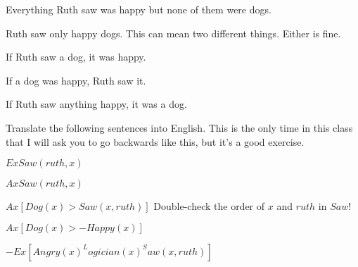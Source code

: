 Everything Ruth saw was happy but none of them were dogs.
        \answer
        $ $
        \endanswer

Ruth saw only happy dogs.
\Hint This can mean two different things. Either is fine.
        \answer
        $ $
        \endanswer

If Ruth saw a dog, it was happy.
        \answer
        $ $
        \endanswer

If a dog was happy, Ruth saw it.
        \answer
        $ $
        \endanswer

If Ruth saw anything happy, it was a dog.
        \answer
        $ $
        \endanswer

\endproblems

Translate the following sentences into English. This is the only time in this class that I will ask you to go backwards like this, but it's a good exercise.

\problems
{}
$ Ex Saw(ruth,x) $
        \answer
         
        \endanswer

$ Ax Saw(ruth,x) $
        \answer
         
        \endanswer

$ Ax[Dog(x) > Saw(x,ruth)] $
\Hint Double-check the order of $x$ and $ruth$ in $Saw$!
        \answer
         
        \endanswer

$ Ax[Dog(x) > -Happy(x)] $
        \answer
         
        \endanswer

$ -Ex[Angry(x) ^ Logician(x) ^ Saw(x,ruth)] $
        \answer
         
        \endanswer

\endproblems
\bye
